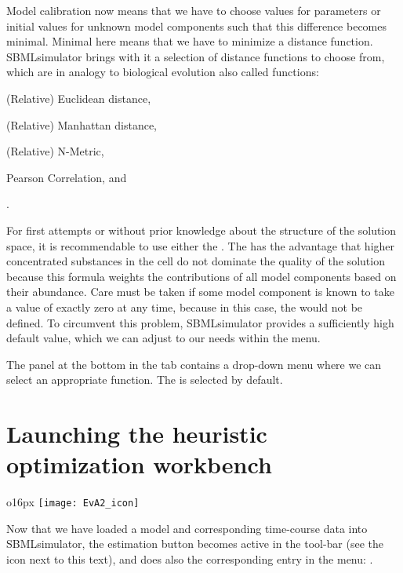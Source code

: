 Model calibration now means that we have to choose values for parameters or initial values for unknown model components such that this difference becomes minimal.
Minimal here means that we have to minimize a distance function.
SBMLsimulator brings with it a selection of distance functions to choose from, which are in analogy to biological evolution also called \emph{\fitness} functions:
\begin{enumerate*}[label=(\roman*)]
  \item (Relative) Euclidean distance,
  \item (Relative) Manhattan distance,
  \item (Relative) N-Metric,
  \item Pearson Correlation, and
  \item \RSE.
\end{enumerate*}
For first attempts or without prior knowledge about the structure of the solution space, it is recommendable to use either the \RSE.
The \RSE has the advantage that higher concentrated substances in the cell do not dominate the quality of the solution because this formula weights the contributions of all model components based on their abundance.
Care must be taken if some model component is known to take a value of exactly zero at any time, because in this case, the \RSE would not be defined.
To circumvent this problem, SBMLsimulator provides a sufficiently high default value, which we can adjust to our needs within the  menu.

The panel at the bottom in the  tab contains a drop-down menu where we can select an appropriate \fitness function.
The \RSE is selected by default.


\section{Launching the heuristic optimization workbench \EvA}
\label{sec:LaunchingEvA}

\begin{wrapfigure}{o}{16px}
\vspace{\wrapfigspace}
\texttt{[image: EvA2\_icon]}
\end{wrapfigure}
Now that we have loaded a model and corresponding time-course data into SBMLsimulator, the estimation button becomes active in the tool-bar (see the icon next to this text), and does also the corresponding entry in the menu: .

